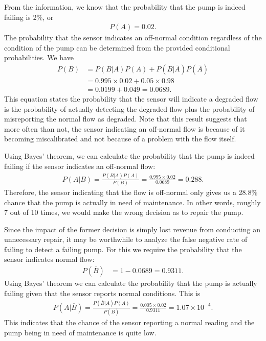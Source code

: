 From the information, we know that the probability that the pump is indeed failing is 2\%, or
\begin{align}
  P(A) = 0.02. \nonumber
\end{align}
The probability that the sensor indicates an off-normal condition regardless of the condition of the pump can be determined from the provided conditional probabilities. We have
\begin{align}
  P(B) &= P(B|A) P(A) + P(B|\overline{A}) P(\overline{A}) \nonumber \\
       &= 0.995 \times 0.02 + 0.05 \times 0.98  \nonumber \\
       &= 0.0199 + 0.049 = 0.0689 . \nonumber
\end{align}
This equation states the probability that the sensor will indicate a degraded flow is the probability of actually detecting the degraded flow plus the probability of misreporting the normal flow as degraded. Note that this result suggests that more often than not, the sensor indicating an off-normal flow is because of it becoming miscalibrated and not because of a problem with the flow itself.

Using Bayes' theorem, we can calculate the probability that the pump is indeed failing if the sensor indicates an off-normal flow:
\begin{align}
  P(A|B) = \frac{ P(B|A) P(A) }{ P(B) } = \frac{ 0.995 \times 0.02 }{ 0.0689 } = 0.288. \nonumber
\end{align}
Therefore, the sensor indicating that the flow is off-normal only gives us a 28.8\% chance that the pump is actually in need of maintenance. In other words, roughly 7 out of 10 times, we would make the wrong decision as to repair the pump.

Since the impact of the former decision is simply lost revenue from conducting an unnecessary repair, it may be worthwhile to analyze the false negative rate of failing to detect a failing pump. For this we require the probability that the sensor indicates normal flow:
\begin{align}
  P(\overline{B}) &= 1 - 0.0689 = 0.9311 . \nonumber
\end{align}
Using Bayes' theorem we can calculate the probability that the pump is actually failing given that the sensor reports normal conditions. This is
\begin{align}
  P(A|\overline{B}) = \frac{ P(\overline{B}|A) P(A) }{ P(\overline{B}) } = \frac{ 0.005 \times 0.02 }{ 0.9311 } = 1.07\times 10^{-4}. \nonumber
\end{align}
This indicates that the chance of the sensor reporting a normal reading and the pump being in need of maintenance is quite low.


